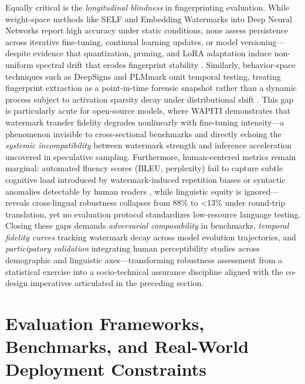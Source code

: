 \documentclass[11pt,a4paper]{article}
\begin{document}
Equally critical is the \emph{longitudinal blindness} in fingerprinting evaluation. While weight-space methods like SELF \cite{arxiv:2512.03620} and Embedding Watermarks into Deep Neural Networks \cite{arxiv:1701.04082} report high accuracy under static conditions, none assess persistence across iterative fine-tuning, continual learning updates, or model versioning---despite evidence that quantization, pruning, and LoRA adaptation induce non-uniform spectral drift that erodes fingerprint stability \cite{doi:10.1109/icassp48485.2024.10447264}. Similarly, behavior-space techniques such as DeepSigns \cite{arxiv:1804.00750} and PLMmark \cite{doi:10.1609/aaai.v37i12.26750} omit temporal testing, treating fingerprint extraction as a point-in-time forensic snapshot rather than a dynamic process subject to activation sparsity decay under distributional shift \cite{arxiv:2509.25448}. This gap is particularly acute for open-source models, where WAPITI \cite{arxiv:2410.06467} demonstrates that watermark transfer fidelity degrades nonlinearly with fine-tuning intensity---a phenomenon invisible to cross-sectional benchmarks and directly echoing the \emph{systemic incompatibility} between watermark strength and inference acceleration uncovered in speculative sampling. Furthermore, human-centered metrics remain marginal: automated fluency scores (BLEU, perplexity) fail to capture subtle cognitive load introduced by watermark-induced repetition biases or syntactic anomalies detectable by human readers \cite{arxiv:2403.04808,arxiv:2405.13517}, while linguistic equity is ignored---\cite{arxiv:2402.14007} reveals cross-lingual robustness collapses from 88\% to <13\% under round-trip translation, yet no evaluation protocol standardizes low-resource language testing. Closing these gaps demands \emph{adversarial composability} in benchmarks, \emph{temporal fidelity curves} tracking watermark decay across model evolution trajectories, and \emph{participatory validation} integrating human perceptibility studies across demographic and linguistic axes---transforming robustness assessment from a statistical exercise into a socio-technical assurance discipline aligned with the co-design imperatives articulated in the preceding section.


\section{Evaluation Frameworks, Benchmarks, and Real-World Deployment Constraints}
\end{document}
